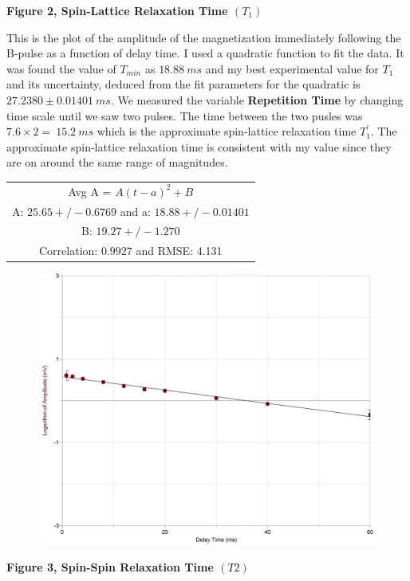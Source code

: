 \documentclass[fleqn]{article}
\begin{document}
  \textbf{Figure 2, Spin-Lattice Relaxation Time $(T_1)$}

  \vspace{10px}

  This is the plot of the amplitude of the magnetization immediately following the B-pulse as a function of delay time. 
  I used a quadratic function to fit the data. It was found the value of $T_{min}$ as $18.88 ~ ms$ and my best 
  experimental value for $T_1$ and its uncertainty, deduced from the fit parameters for the quadratic is
  $27.2380 \pm 0.01401 ~ ms$. 
  We measured the variable \textbf{Repetition Time} by changing time scale until we saw two pulses. The time between the 
  two pusles was $7.6 \times 2= ~ 15.2 ~ ms$ which is the approximate spin-lattice relaxation time $T_1^'$. The 
  approximate spin-lattice relaxation time is consistent with my value since they are on around the same range of magnitudes.

  \begin{center}
    \begin{tabular}{ |c| } 
     \hline
     Avg A = $A(t-a)^2+B$  \\ 
     A: $25.65 +/- 0.6769$ and a: $18.88 +/- 0.01401$  \\ 
     B: $19.27 +/- 1.270$  \\ 
     Correlation: $0.9927$ and RMSE: 4.131 \\
     \hline
    \end{tabular}
  \end{center}

  \pagebreak

  \includegraphics[height=9cm, width=14cm]{Fig3.JPG}

  \textbf{Figure 3, Spin-Spin Relaxation Time $(T2)$}
\end{document}
